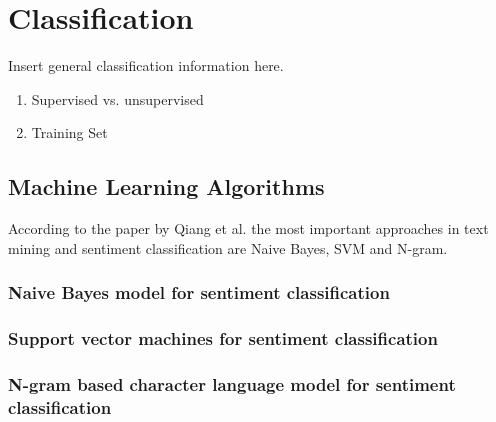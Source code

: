 \section{Classification}
Insert general classification information here.

\begin{enumerate}
\item Supervised vs. unsupervised
\item Training Set
\end{enumerate}


\subsection{Machine Learning Algorithms}
According to the paper by Qiang et al.\autocite{Ye20096527} the most important approaches in 
text mining and sentiment classification are Naive Bayes, SVM and 
N-gram.

\subsubsection{Naive Bayes model for sentiment classification}


\subsubsection{Support vector machines for sentiment classification}

\subsubsection{N-gram based character language model for sentiment classification}



